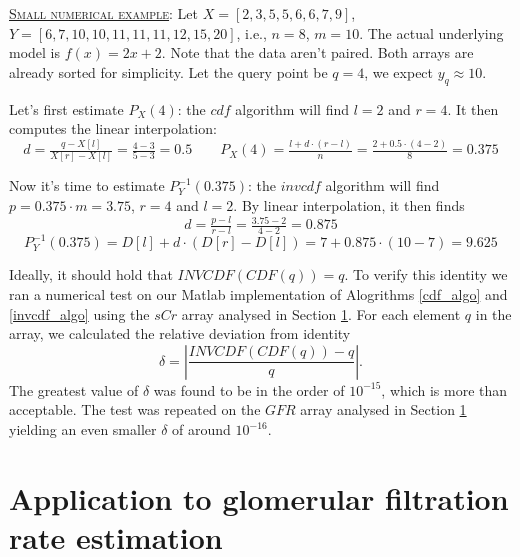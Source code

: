 \documentclass[10pt,final]{siamltex}
\begin{document}
\begin{tcolorbox}[colback=gray!30,%
  colframe=black,%
  width=\dimexpr\linewidth-2\fboxrule\relax,
  arc=3mm, auto outer arc,
  breakable
  ]
  \underline{\textsc{Small numerical example}}: Let $X=[2,3,5,5,6,6,7,9]$, $Y=[6,7,10,10,11,11,11,12,15,20]$, i.e., $n=8$, $m=10$. The actual underlying model is $f(x)=2x+2$. Note that the data aren't paired. Both arrays are already sorted for simplicity. Let the query point be $q=4$, we expect $y_q\approx10$.

  Let's first estimate $P_X(4)$: the $cdf$ algorithm will find $l=2$ and $r=4$. It then computes the linear interpolation:
  \begin{equation*}
    d = \tfrac{q-X[l]}{X[r]-X[l]} = \tfrac{4-3}{5-3} = 0.5
    \quad\quad
    P_X(4)=\tfrac{l+d\cdot(r-l)}{n}=\tfrac{2+0.5\cdot(4-2)}{8}=0.375
  \end{equation*}

  Now it's time to estimate $P^{-1}_Y(0.375)$: the $invcdf$ algorithm will find $p = 0.375\cdot m=3.75$, $r=4$ and $l=2$. By linear interpolation, it then finds
  \begin{equation*}
    d = \tfrac{p-l}{r-l} = \tfrac{3.75-2}{4-2} = 0.875
  \end{equation*}
  \begin{equation*}
    P^{-1}_Y(0.375)=D[l]+d\cdot(D[r]-D[l])=7+0.875\cdot(10-7)=9.625
  \end{equation*}
\end{tcolorbox}

Ideally, it should hold that $INVCDF(CDF(q))=q$. To verify this identity we ran a numerical test on our Matlab implementation of Alogrithms \ref{cdf_algo} and \ref{invcdf_algo} using the $sCr$ array analysed in Section \ref{gfr}. For each element $q$ in the array, we calculated the relative deviation from identity
$$ \delta = \left|\frac{INVCDF(CDF(q)) - q}{q}\right|.$$
The greatest value of $\delta$ was found to be in the order of $10^{-15}$, which is more than acceptable. The test was repeated on the $GFR$ array analysed in Section \ref{gfr} yielding an even smaller $\delta$ of around $10^{-16}$.
%
\section{Application to glomerular filtration rate estimation}\label{gfr}
\end{document}
